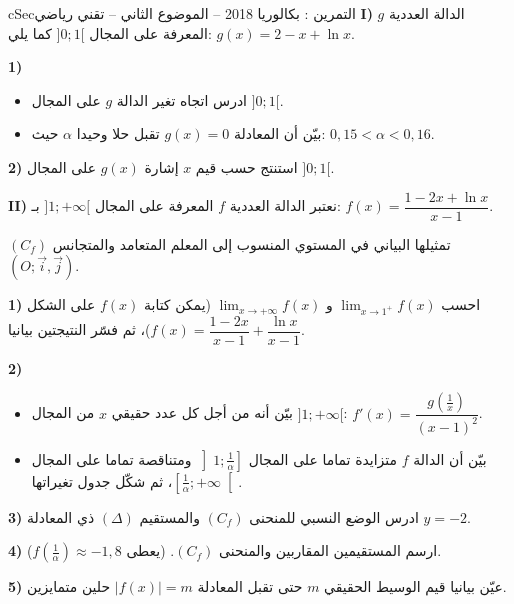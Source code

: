 \documentclass[12pt,a4paper]{article}
\newenvironment{BOX}[2]{\begin{otherlanguage}{english}\begin{arbox}{#1}{#2}}{\end{arbox}\end{otherlanguage}}
\newcounter{exo}
\newenvironment{tamrin}[1]{\stepcounter{exo}\begin{BOX}{cSec}{التمرين \theexo: #1}}{\end{BOX}}
\newenvironment{sq}{\begin{itemize}[leftmargin=2.4em,itemsep=3pt]}{\end{itemize}}
\newcommand{\qa}{\item[(أ)]}\newcommand{\qb}{\item[(ب)]}\newcommand{\qc}{\item[(جـ)]}\newcommand{\qd}{\item[(د)]}\newcommand{\qe}{\item[(هـ)]}
\begin{document}
\begin{tamrin}{بكالوريا 2018 -- الموضوع الثاني -- تقني رياضي}
\textbf{I)} $g$ الدالة العددية المعرفة على المجال $]0;1[$ كما يلي: $g(x)=2-x+\ln x$.

\textbf{1)}
\begin{sq}
\qa ادرس اتجاه تغير الدالة $g$ على المجال $]0;1[$.
\qb بيّن أن المعادلة $g(x)=0$ تقبل حلا وحيدا $\alpha$ حيث: $0{,}15<\alpha<0{,}16$.
\end{sq}
\textbf{2)} استنتج حسب قيم $x$ إشارة $g(x)$ على المجال $]0;1[$.

\textbf{II)} نعتبر الدالة العددية $f$ المعرفة على المجال $]1;+\infty[$ بـ: $f(x)=\dfrac{1-2x+\ln x}{x-1}$.

$(C_f)$ تمثيلها البياني في المستوي المنسوب إلى المعلم المتعامد والمتجانس $(O;\vec i,\vec j)$.

\textbf{1)} احسب $\displaystyle\lim_{x\to1^+}f(x)$ و $\displaystyle\lim_{x\to+\infty}f(x)$ (يمكن كتابة $f(x)$ على الشكل $f(x)=\dfrac{1-2x}{x-1}+\dfrac{\ln x}{x-1}$)، ثم فسّر النتيجتين بيانيا.

\textbf{2)}
\begin{sq}
\qa بيّن أنه من أجل كل عدد حقيقي $x$ من المجال $]1;+\infty[$: $f'(x)=\dfrac{g\left(\frac1x\right)}{(x-1)^2}$.
\qb بيّن أن الدالة $f$ متزايدة تماما على المجال $\left]1;\frac1\alpha\right]$ ومتناقصة تماما على المجال $\left[\frac1\alpha;+\infty\right[$، ثم شكّل جدول تغيراتها.
\end{sq}
\textbf{3)} ادرس الوضع النسبي للمنحنى $(C_f)$ والمستقيم $(\Delta)$ ذي المعادلة $y=-2$.

\textbf{4)} ارسم المستقيمين المقاربين والمنحنى $(C_f)$. (يعطى $f\left(\frac1\alpha\right)\approx-1{,}8$).

\textbf{5)} عيّن بيانيا قيم الوسيط الحقيقي $m$ حتى تقبل المعادلة $|f(x)|=m$ حلين متمايزين.
\end{tamrin}
\end{document}
